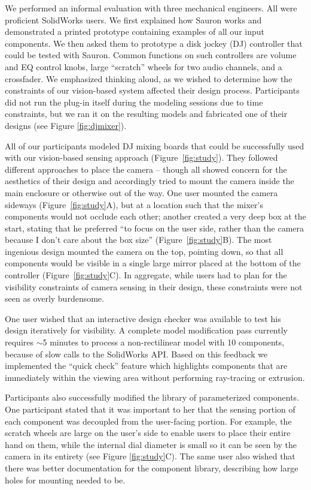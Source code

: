    We performed an informal evaluation with three  mechanical engineers. All were proficient SolidWorks users.  We first explained how Sauron works and demonstrated a printed prototype containing examples of all our input components.  We then asked them to prototype a disk jockey (DJ) controller that could be tested with Sauron. Common functions on such controllers are volume and EQ control knobs, large ``scratch'' wheels for two audio channels, and a crossfader.  We emphasized thinking aloud, as we wished to determine how the constraints of our vision-based system affected their design process.  Participants did not run the plug-in itself during the modeling sessions due to time constraints, but we ran it on the resulting models and fabricated one of their designs (see Figure \ref{fig:djmixer}).

All of our participants modeled DJ mixing boards that could be successfully used with our vision-based sensing approach (Figure~\ref{fig:study}). They followed different approaches to place the camera -- though all showed concern for the aesthetics of their design and accordingly tried to mount the camera inside the main enclosure or otherwise out of the way. One user mounted the camera sideways (Figure~\ref{fig:study}A), but at a location such that the mixer's components would not occlude each other; another created a very deep box at the start, stating that he preferred ``to focus on the user side, rather than the camera because I don't care about the box size'' (Figure~\ref{fig:study}B). The most ingenious design mounted the camera on the top, pointing down, so that all components would be visible in a single large mirror placed at the bottom of the controller (Figure~\ref{fig:study}C). In aggregate, while users had to plan for the visibility constraints of camera sensing in their design, these constraints were not seen as overly burdensome.

One user wished that an interactive design checker was available to test his design iteratively for visibility. A complete model modification pass currently requires $\sim$5 minutes to process a non-rectilinear model with 10 components, because of slow calls to the SolidWorks API. Based on this feedback we implemented the ``quick check'' feature which highlights components that are immediately within the viewing area without performing ray-tracing or extrusion.

Participants also successfully modified the library of parameterized components. One participant stated that it was important to her that the sensing portion of each component was decoupled from the user-facing portion.  For example, the scratch wheels are large on the user's side to enable users to place their entire hand on them, while the internal dial diameter is small so it can be seen by the camera in its entirety (see Figure \ref{fig:study}C). The same user also wished that there was better documentation for the component library, describing how large holes for mounting needed to be.


